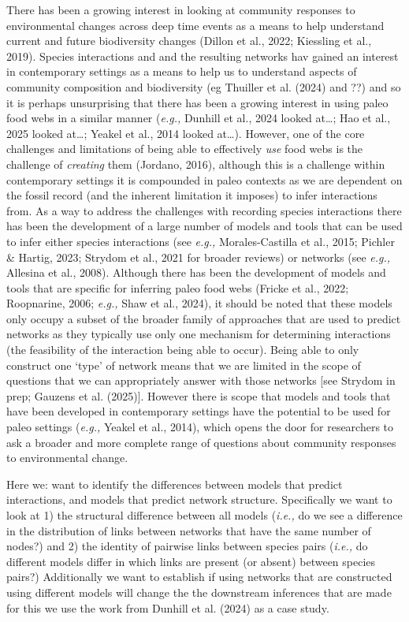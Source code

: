 \documentclass[
]{article}
\begin{document}
There has been a growing interest in looking at community responses to
environmental changes across deep time events as a means to help
understand current and future biodiversity changes (Dillon et al., 2022;
Kiessling et al., 2019). Species interactions and and the resulting
networks hav gained an interest in contemporary settings as a means to
help us to understand aspects of community composition and biodiversity
(eg Thuiller et al. (2024) and ??) and so it is perhaps unsurprising
that there has been a growing interest in using paleo food webs in a
similar manner (\emph{e.g.,} Dunhill et al., 2024 looked at\ldots; Hao
et al., 2025 looked at\ldots; Yeakel et al., 2014 looked at\ldots).
However, one of the core challenges and limitations of being able to
effectively \emph{use} food webs is the challenge of \emph{creating}
them (Jordano, 2016), although this is a challenge within contemporary
settings it is compounded in paleo contexts as we are dependent on the
fossil record (and the inherent limitation it imposes) to infer
interactions from. As a way to address the challenges with recording
species interactions there has been the development of a large number of
models and tools that can be used to infer either species interactions
(see \emph{e.g.,} Morales-Castilla et al., 2015; Pichler \& Hartig,
2023; Strydom et al., 2021 for broader reviews) or networks (see
\emph{e.g.,} Allesina et al., 2008). Although there has been the
development of models and tools that are specific for inferring paleo
food webs (Fricke et al., 2022; Roopnarine, 2006; \emph{e.g.,} Shaw et
al., 2024), it should be noted that these models only occupy a subset of
the broader family of approaches that are used to predict networks as
they typically use only one mechanism for determining interactions (the
feasibility of the interaction being able to occur). Being able to only
construct one `type' of network means that we are limited in the scope
of questions that we can appropriately answer with those networks {[}see
Strydom in prep; Gauzens et al. (2025){]}. However there is scope that
models and tools that have been developed in contemporary settings have
the potential to be used for paleo settings (\emph{e.g.,} Yeakel et al.,
2014), which opens the door for researchers to ask a broader and more
complete range of questions about community responses to environmental
change.

Here we: want to identify the differences between models that predict
interactions, and models that predict network structure. Specifically we
want to look at 1) the structural difference between all models
(\emph{i.e.,} do we see a difference in the distribution of links
between networks that have the same number of nodes?) and 2) the
identity of pairwise links between species pairs (\emph{i.e.,} do
different models differ in which links are present (or absent) between
species pairs?) Additionally we want to establish if using networks that
are constructed using different models will change the the downstream
inferences that are made for this we use the work from Dunhill et al.
(2024) as a case study.
\end{document}
